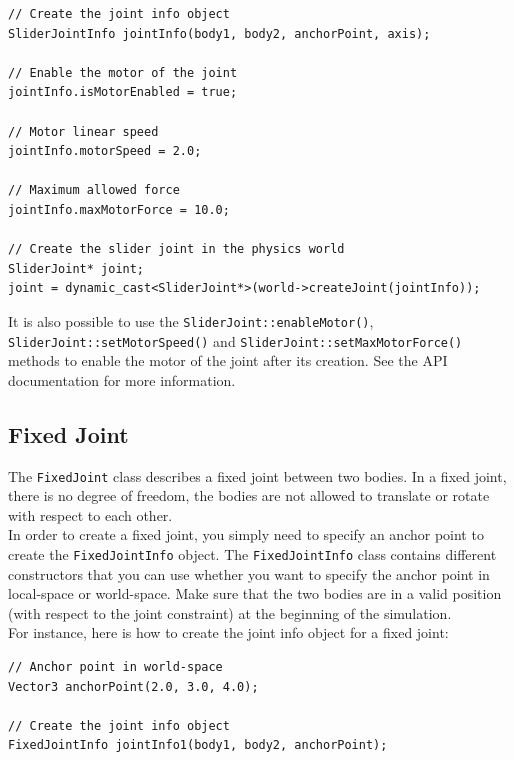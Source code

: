 \documentclass[a4paper,12pt]{article}
\begin{document}
     \begin{lstlisting}
// Create the joint info object
SliderJointInfo jointInfo(body1, body2, anchorPoint, axis);

// Enable the motor of the joint
jointInfo.isMotorEnabled = true;

// Motor linear speed
jointInfo.motorSpeed = 2.0;

// Maximum allowed force
jointInfo.maxMotorForce = 10.0;

// Create the slider joint in the physics world
SliderJoint* joint;
joint = dynamic_cast<SliderJoint*>(world->createJoint(jointInfo));
  \end{lstlisting}

     \vspace{0.6cm}

     \begin{sloppypar}
        It is also possible to use the \texttt{SliderJoint::enableMotor()}, \texttt{SliderJoint::setMotorSpeed()} and \texttt{SliderJoint::setMaxMotorForce()} methods to enable the
        motor of the joint after its creation. See the API documentation for more information.
     \end{sloppypar}

    \subsection{Fixed Joint}

    The \texttt{FixedJoint} class describes a fixed joint between two bodies. In a fixed joint, there is no degree of freedom, the bodies are not
    allowed to translate or rotate with respect to each other. \\

    In order to create a fixed joint, you simply need to specify an anchor point to create the \texttt{FixedJointInfo}
    object. The \texttt{FixedJointInfo} class contains different constructors that you can use whether you want to specify the anchor point in local-space
    or world-space. Make sure that the two bodies are in a valid position (with respect to the joint constraint) at the beginning of the simulation.\\

    For instance, here is how to create the joint info object for a fixed joint: \\

    \begin{lstlisting}
// Anchor point in world-space
Vector3 anchorPoint(2.0, 3.0, 4.0);

// Create the joint info object
FixedJointInfo jointInfo1(body1, body2, anchorPoint);
  \end{lstlisting}
\end{document}
